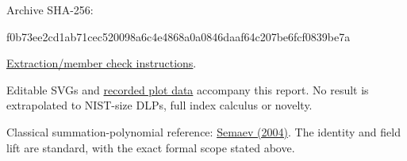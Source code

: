 \documentclass[
  10pt,
]{article}
\newenvironment{Shaded}{}{}
\newcommand{\NormalTok}[1]{#1}
\begin{document}
Archive SHA-256:

\begin{Shaded}
\begin{Highlighting}[]
\NormalTok{f0b73ee2cd1ab71cec520098a6c4e4868a0a0846daaf64c207be6fcf0839be7a}
\end{Highlighting}
\end{Shaded}

\href{../../../execution-v3/continue-20261026/README.md}{Extraction/member
check instructions}.

Editable SVGs and \href{PLOT_DATA.json}{recorded plot data} accompany
this report. No result is extrapolated to NIST-size DLPs, full index
calculus or novelty.

Classical summation-polynomial reference:
\href{https://eprint.iacr.org/2004/031}{Semaev (2004)}. The identity and
field lift are standard, with the exact formal scope stated above.
\end{document}
